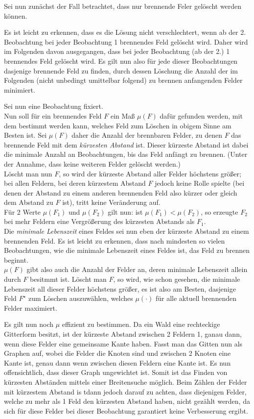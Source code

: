 Sei nun zunächst der Fall betrachtet, dass nur brennende Feler gelöscht werden können.

Es ist leicht zu erkennen, dass es die Lösung nicht verschlechtert, wenn ab der 2. Beobachtung bei jeder Beobachtung 1 brennendes Feld gelöscht wird. Daher wird im Folgenden davon ausgegangen, dass bei jeder Beobachtung (ab der 2.) 1 brennendes Feld gelöscht wird. Es gilt nun also für jede dieser Beobachtungen dasjenige brennende Feld zu finden, durch dessen Löschung die Anzahl der im Folgenden (nicht unbedingt umittelbar folgend) zu brennen anfangenden Felder minimiert.

Sei nun eine Beobachtung fixiert.\\
Nun soll für ein brennendes Feld $F$ ein Maß $\mu(F)$ dafür gefunden werden, mit dem bestimmt werden kann, welches Feld zum Löschen in obigem Sinne am Besten ist. Sei $\mu(F)$ daher die Anzahl der brennbaren Felder, zu denen $F$ das brennende Feld mit dem \emph{kürzesten Abstand} ist. Dieser kürzeste Abstand ist dabei die minimale Anzahl an Beobachtungen, bis das Feld anfängt zu brennen. (Unter der Annahme, dass keine weiteren Felder gelöscht werden.)\\
Löscht man nun $F$, so wird der kürzeste Abstand aller Felder höchstens größer; bei allen Feldern, bei deren kürzestem Abstand $F$ jedoch keine Rolle spielte (bei denen der Abstand zu einem anderen brennenden Feld also kürzer oder gleich dem Abstand zu $F$ ist), tritt keine Veränderung auf.\\
Für 2 Werte $\mu(F_1)$ und $\mu(F_2)$ gilt nun: ist $\mu(F_1) < \mu(F_2)$, so erzeugte $F_2$ bei mehr Feldern eine Vergrößerung des kürzesten Abstands als $F_1$.\\
Die \emph{minimale Lebenszeit} eines Feldes sei nun eben der kürzeste Abstand zu einem brennenden Feld. Es ist leicht zu erkennen, dass nach mindesten so vielen Beobachtungen, wie die minimale Lebenszeit eines Feldes ist, das Feld zu brennen beginnt.\\
$\mu(F)$ gibt also auch die Anzahl der Felder an, deren minimale Lebenszeit allein durch $F$ besitmmt ist. Löscht man $F$, so wird, wie schon gesehen, die minimale Lebenszeit all dieser Felder höchstens größer, es ist also am Besten, dasjenige Feld $F^\star$ zum Löschen auszuwählen, welches $\mu(\cdot)$ für alle aktuell brennenden Felder maximiert.

Es gilt nun noch $\mu$ effizient zu bestimmen. Da ein Wald eine rechteckige Gitterform besitzt, ist der kürzeste Abstand zwischen 2 Feldern 1, ganau dann, wenn diese Felder eine gemeinsame Kante haben. Fasst man das Gitten nun als Graphen auf, wobei die Felder die Knoten sind und zwischen 2 Knoten eine Kante ist, genau dann wenn zwischen diesen Feldern eine Kante ist. Es nun offensichtlich, dass dieser Graph ungewichtet ist. Somit ist das Finden von kürzesten Abständen mittels einer Breitensuche möglich. Beim Zählen der Felder mit kürzestem Abstand is tdann jedoch darauf zu achten, dass diejenigen Felder, welche zu mehr als 1 Feld den kürzesten Abstand haben, nicht gezählt werden, da sich für diese Felder bei dieser Beobachtung garantiert keine Verbesserung ergibt.

